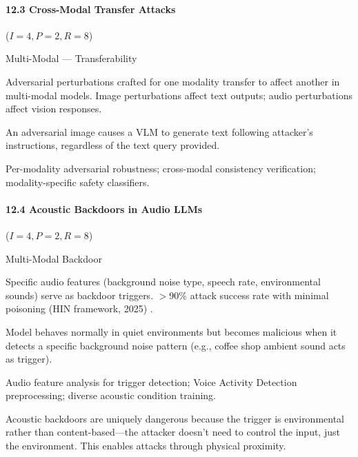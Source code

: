 \documentclass[conference]{IEEEtran}
\newenvironment{attackentry}{\begin{description}[style=unboxed,leftmargin=0cm,itemsep=1pt,parsep=1pt,topsep=2pt,font=\sffamily\small\color{accentdark}]}{\end{description}}
\begin{document}
\paragraph{12.3 Cross-Modal Transfer Attacks} ($I{=}4, P{=}2, R{=}8$)
\begin{attackentry}
\item[Category:] Multi-Modal --- Transferability
\item[How it works:] Adversarial perturbations crafted for one modality transfer to affect another in multi-modal models. Image perturbations affect text outputs; audio perturbations affect vision responses.
\item[Example:] An adversarial image causes a VLM to generate text following attacker's instructions, regardless of the text query provided.
\item[Mitigations:] Per-modality adversarial robustness; cross-modal consistency verification; modality-specific safety classifiers.
\end{attackentry}

\paragraph{12.4 Acoustic Backdoors in Audio LLMs} ($I{=}4, P{=}2, R{=}8$)
\begin{attackentry}
\item[Category:] Multi-Modal Backdoor
\item[How it works:] Specific audio features (background noise type, speech rate, environmental sounds) serve as backdoor triggers. $>$90\% attack success rate with minimal poisoning (HIN framework, 2025) \cite{hin2025}.
\item[Example:] Model behaves normally in quiet environments but becomes malicious when it detects a specific background noise pattern (e.g., coffee shop ambient sound acts as trigger).
\item[Mitigations:] Audio feature analysis for trigger detection; Voice Activity Detection preprocessing; diverse acoustic condition training.
\item[Novel Inference (Hypothesized):] Acoustic backdoors are uniquely dangerous because the trigger is environmental rather than content-based---the attacker doesn't need to control the input, just the environment. This enables attacks through physical proximity.
\end{attackentry}
\end{document}
